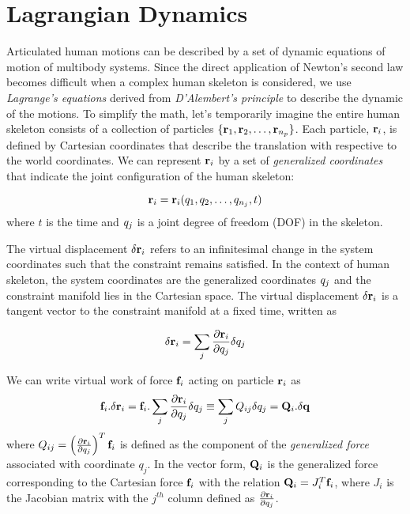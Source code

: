 \section{Lagrangian Dynamics}
\label{sec:lagrangian}
Articulated human motions can be described by a set of dynamic
equations of motion of multibody systems. Since the direct application
of Newton's second law becomes difficult when a complex human skeleton
is considered, we use \emph{Lagrange's equations} derived from
\emph{D'Alembert's principle} to describe the dynamic of the
motions. To simplify the math, let's temporarily imagine the entire
human skeleton consists of a collection of particles
$\{\mathbf{r}_1, \mathbf{r}_2, \ldots,
\mathbf{r}_{n_p}\}$.  Each particle, $\mathbf{r}_i$,
is defined by Cartesian coordinates that describe the translation with
respective to the world coordinates.  We can represent
$\mathbf{r}_i$ by a set of \emph{generalized coordinates} that
indicate the joint configuration of the human skeleton:

\begin{equation}\label{eq:general_coord}
    \mathbf{r}_i = \mathbf{r}_i(q_{1},
q_{2}, \ldots, q_{n_j}, t)
\end{equation}
where $t$ is the time and $q_j$ is a joint degree of freedom (DOF) in
the skeleton.

The virtual displacement $\delta \mathbf{r}_i$ refers to an
infinitesimal change in the system coordinates such that the
constraint remains satisfied. In the context of human skeleton, the
system coordinates are the generalized coordinates $q_j$ and the
constraint manifold lies in the Cartesian space. The virtual
displacement $\delta \mathbf{r}_i$ is a tangent vector to the
constraint manifold at a fixed time, written as

\begin{equation}\label{eq:virtual_displace}
    \delta \mathbf{r}_i = \sum_j \frac{\partial \mathbf{r}_i}{\partial
    q_j}\delta q_j
\end{equation}

We can write virtual work of force $\mathbf{f}_{i}$ acting on particle
$\mathbf{r}_i$ as
\begin{equation}\label{eq:virtual_work}
  \mathbf{f}_{i} . \delta \mathbf{r}_i = \mathbf{f}_{i} . \sum_j \frac{\partial \mathbf{r}_i}{\partial
    q_j}\delta q_j \equiv \sum_j Q_{ij} \delta q_j = \mathbf{Q}_i.\delta \mathbf{q}
\end{equation}
where $Q_{ij} = \left ( \frac{\partial \mathbf{r}_i}{\partial q_j} \right )^T \mathbf{f}_i$ is defined as the component of the \emph{generalized force}
associated with coordinate $q_j$. In the vector form, $\mathbf{Q}_i$ is the generalized force corresponding to the Cartesian force $\mathbf{f}_i$ with the relation $\mathbf{Q}_i = J_i^T \mathbf{f}_i$, where $J_i$ is the Jacobian matrix with the $j^{th}$ column defined as $\frac{\partial \mathbf{r}_i}{\partial q_j}$.

